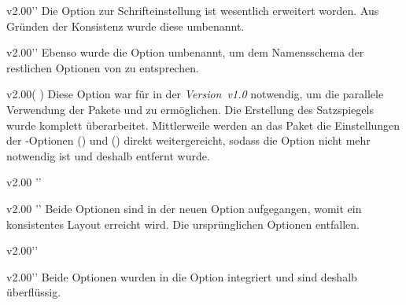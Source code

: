 \begin{Obsolete}{v2.00}{}''
\printdeclarationlist%
%
Die Option zur Schrifteinstellung ist wesentlich erweitert worden. Aus Gründen 
der Konsistenz wurde diese umbenannt.
\end{Obsolete}

\begin{Obsolete}{v2.00}{}''
\printdeclarationlist%
%
Ebenso wurde die Option  umbenannt, um dem Namensschema der 
restlichen Optionen von \TUDScript zu entsprechen.
\end{Obsolete}

\begin{Obsolete}{v2.00}{}(%
)
\printdeclarationlist%
%
Diese Option war für \TUDScript in der \emph{Version~v1.0} notwendig, um die 
parallele Verwendung der Pakete  und  zu 
ermöglichen. Die Erstellung des Satzspiegels wurde komplett überarbeitet. 
Mittlerweile werden an das Paket  die Einstellungen der 
\KOMAScript-Optionen () und 
() direkt weitergereicht, sodass die 
Option  nicht mehr notwendig ist und deshalb entfernt wurde.
\end{Obsolete}

\begin{Obsolete}{v2.00}{}%
  ''%
\begin{Obsolete}{v2.00}{}%
  ''%
\printdeclarationlist%
%
Beide Optionen sind in der neuen Option  
aufgegangen, womit ein konsistentes Layout erreicht wird. Die ursprünglichen 
Optionen entfallen. 
\end{Obsolete}
\end{Obsolete}

\begin{Obsolete}{v2.00}{}''
\begin{Obsolete}{v2.00}{}''
\printdeclarationlist%
%
Beide Optionen wurden in die Option  integriert und sind 
deshalb überflüssig.
\end{Obsolete}
\end{Obsolete}

